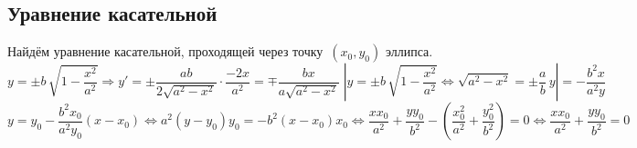\subsection{Уравнение касательной}
Найдём уравнение касательной, проходящей через точку~$(x_0, y_0)$ эллипса.
\begin{equation*}
y = \pm b\,\sqrt{1 - \frac{x^2}{a^2}} \Rightarrow
y' = \pm\frac{ab}{2\sqrt{a^2 - x^2}} \cdot \frac{-2x}{a^2} =
\mp\frac{bx}{a\sqrt{a^2 - x^2}} \;
\left|y = \pm b\,\sqrt{1 - \frac{x^2}{a^2}} \Leftrightarrow
\sqrt{a^2 - x^2} = \pm\frac{a}b\,y\right| =
-\frac{b^2 x}{a^2 y}
\end{equation*}
\begin{equation*}
y = y_0 - \frac{b^2 x_0}{a^2 y_0} (x - x_0) \Leftrightarrow
a^2 (y - y_0) y_0 = -b^2 (x - x_0) x_0 \Leftrightarrow
\frac{x x_0}{a^2} + \frac{y y_0}{b^2} - \left(\frac{x_0^2}{a^2} + \frac{y_0^2}{b^2} \right) = 0 \Leftrightarrow
\frac{x x_0}{a^2} + \frac{y y_0}{b^2} = 0
\end{equation*}